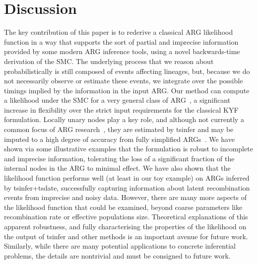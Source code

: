 \documentclass{article}
\begin{document}
\section*{Discussion}
The key contribution of this paper is to rederive a classical
ARG likelihood function in a way that supports the sort of partial
and imprecise information
provided by some modern ARG inference tools, 
using a novel backwards-time derivation of the SMC.
The underlying process that we reason about probabilistically is still
composed of events affecting lineages, but, because we
do not necessarily observe or estimate these events,
we integrate over the possible timings implied by the information
in the input ARG.
Our method can compute a likelihood under the SMC for a very general class of
ARG~\citep{wong_general_2023},
a significant increase in flexibility over the
strict input requirements for the classical KYF  
formulation.
Locally unary nodes play a key role, and although not
currently a common focus of ARG research~\citep{wong_general_2023},
they are estimated by tsinfer and may be imputed to a high
degree of accuracy from fully simplified ARGs~\citep{fritze2024forest}.
We have shown via some illustrative examples that the formulation is
robust to incomplete and imprecise information, tolerating the loss
of a significant fraction of the internal nodes in the ARG to minimal effect.
We have also shown that the likelihood function performs well
(at least in our toy example) on ARGs inferred by tsinfer+tsdate,
successfully capturing information about latent recombination events
from imprecise and noisy data.
However, there are many more aspects of the likelihood function
that could be examined, beyond coarse parameters like recombination rate
or effective populations size.
Theoretical explanations of this apparent robustness,
and fully characterising the properties of the likelihood on the output
of tsinfer and other methods is an important avenue for future work.
Similarly, while there are many potential applications to concrete
inferential problems, the details are nontrivial and must be
consigned to future work.


\end{document}
